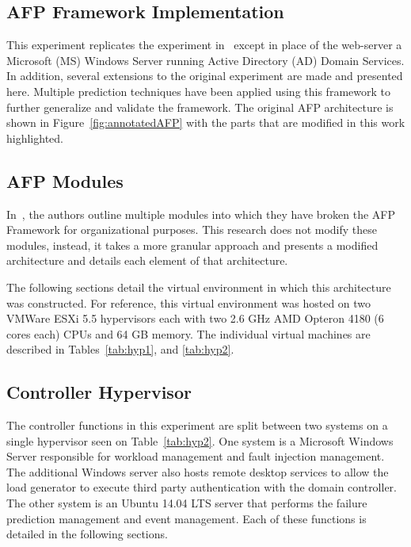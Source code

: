 \subsection{AFP Framework Implementation}
This experiment replicates the experiment in~\cite{irrera2015} except in place
of the web-server a Microsoft (MS) Windows Server running Active Directory (AD)
Domain Services.  In addition, several extensions to the original experiment
are made and presented here.  Multiple prediction techniques have been applied
using this framework to further generalize and validate the framework.  The
original AFP architecture is shown in Figure~\ref{fig:annotatedAFP} with the
parts that are modified in this work highlighted.  

\subsection{AFP Modules}
In~\cite{irrera2015}, the authors outline multiple modules into which they have
broken the AFP Framework for organizational purposes.  This research does not
modify these modules, instead, it takes a more granular approach and presents a
modified architecture and details each element of that architecture.

\figannotatedAFP  

The following sections detail the virtual environment in which this
architecture was constructed.  For reference, this virtual environment was
hosted on two VMWare ESXi 5.5 hypervisors each with two 2.6 GHz AMD Opteron
4180 (6 cores each) CPUs and 64 GB memory.  The individual virtual machines are
described in Tables~\ref{tab:hyp1}, and \ref{tab:hyp2}.

\tabHypervisorOne
\tabHypervisorTwo

\setcounter{secnumdepth}{5}

\subsection{Controller Hypervisor} \label{sec:controller} %
The controller functions in this experiment are split between two systems on a
single hypervisor seen on Table~\ref{tab:hyp2}.  One system is a Microsoft
Windows Server responsible for workload management and fault injection
management.  The additional Windows server also hosts remote desktop services
to allow the load generator to execute third party authentication with the
domain controller.  The other system is an Ubuntu 14.04 LTS server that
performs the failure prediction management and event management.  Each of
these functions is detailed in the following sections.

